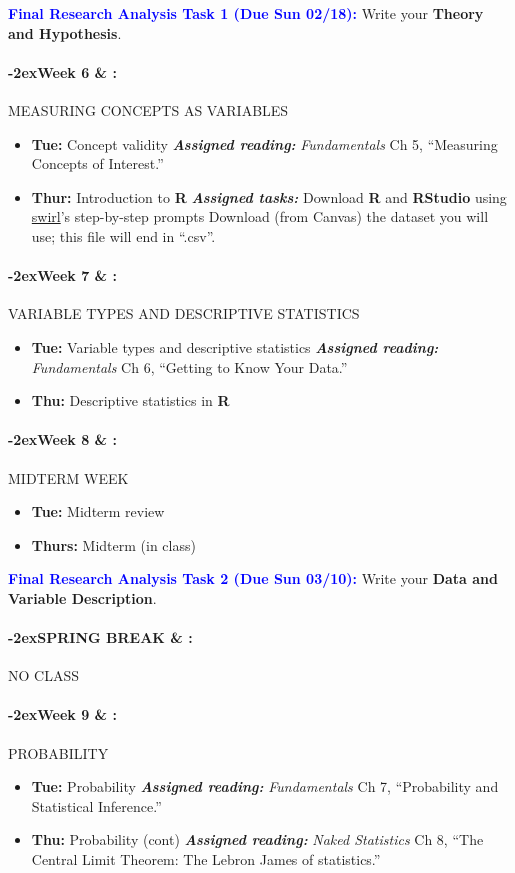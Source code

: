 \documentclass[11pt]{article}
\newcommand{\week}[1]{%
  \paragraph*{\kern-2ex\quad #1 \AdvanceDate[1]\syldate{\today} \& \AdvanceDate[2]\syldate{\today} :}%
  \ifdim\wd1=\wd\MONDAY
    \AdvanceDate[7]
  \else
    \AdvanceDate[7]
  \fi%
}
\begin{document}
\noindent \textcolor{blue}{\textbf{Final Research Analysis Task 1 (Due Sun 02/18):}} Write your \textbf{Theory and Hypothesis}.

\week{Week 6} MEASURING CONCEPTS AS VARIABLES

\begin{itemize}
    \item []\textbf{Tue:} Concept validity
    \subitem \textbf{\textit{Assigned reading:}} \textit{Fundamentals} Ch 5, ``Measuring Concepts of Interest.''
    \item [] \textbf{Thur:} Introduction to \textbf{\textsf{R}}
        \subitem \textbf{\textit{Assigned tasks:}} 
            \subsubitem Download \textbf{\textsf{R}} and \textbf{\textsf{RStudio}} using \href{https://swirlstats.com/students.htm}{swirl}'s step-by-step prompts
            \subsubitem Download (from Canvas) the dataset you will use; this file will end in ``.csv''.
\end{itemize}


\week{Week 7} VARIABLE TYPES AND DESCRIPTIVE STATISTICS

\begin{itemize}
    \item [] \textbf{Tue:} Variable types and descriptive statistics
    \subitem \textbf{\textit{Assigned reading:}} \textit{Fundamentals} Ch 6, ``Getting to Know Your Data.''
    \item [] \textbf{Thu:} Descriptive statistics in \textbf{\textsf{R}}
\end{itemize}


\week{Week 8} MIDTERM WEEK

\begin{itemize}
    \item[] \textbf{Tue:} Midterm review
    \item[] \textbf{Thurs:} Midterm (in class)
\end{itemize}

\noindent \textcolor{blue}{\textbf{Final Research Analysis Task 2 (Due Sun 03/10):}} Write your \textbf{Data and Variable Description}.

\week{SPRING BREAK} NO CLASS

\week{Week 9} PROBABILITY

\begin{itemize}
    \item [] \textbf{Tue:} Probability
    \subitem \textbf{\textit{Assigned reading:}} \textit{Fundamentals} Ch 7, ``Probability and Statistical Inference.''
    \item [] \textbf{Thu:} Probability (cont)
    \subitem \textbf{\textit{Assigned reading:}} \textit{Naked Statistics} Ch 8, ``The Central Limit Theorem: The Lebron James\vspace{-5pt} \subitem of statistics.''
\end{itemize}
\end{document}
